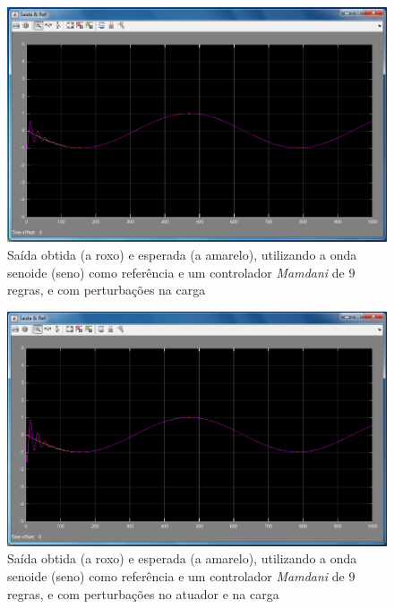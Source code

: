 \documentclass{article}
\begin{document}
\begin{figure}[h]
  \centering
      \includegraphics[scale=0.3]{Images/Mamdani_9_sin_charge.png}
  \caption{Saída obtida (a roxo) e esperada (a amarelo), utilizando a onda senoide (seno) como referência e um controlador \emph{Mamdani} de $9$ regras, e com perturbações na carga}
\end{figure}

\begin{figure}[h]
  \centering
      \includegraphics[scale=0.3]{Images/Mamdani_9_sin_actuator_charge.png}
  \caption{Saída obtida (a roxo) e esperada (a amarelo), utilizando a onda senoide (seno) como referência e um controlador \emph{Mamdani} de $9$ regras, e com perturbações no atuador e na carga}
\end{figure}

\end{document}
